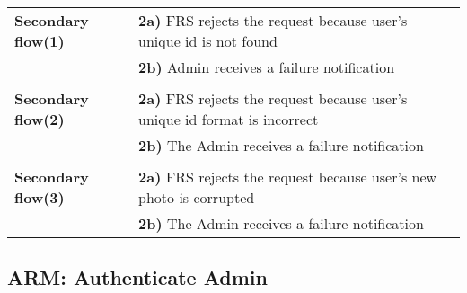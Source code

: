 \documentclass[a4paper,11pt]{article}
\begin{document}
\begin{tabular}{|p{3.5cm}|p{11.5cm}|}
    \\ \hline \rowcolor{Gray} & \\ \hline

    \textbf{Secondary flow(1)} &
    \textbf{2a)} FRS rejects the request because user's unique id is not found \\&
    \textbf{2b)} Admin receives a failure notification

    \\ \hline \rowcolor{Gray} & \\ \hline

    \textbf{Secondary flow(2)} &
    \textbf{2a)} FRS rejects the request because user's unique id format is incorrect \\&
    \textbf{2b)} The Admin receives a failure notification

    \\ \hline \rowcolor{Gray} & \\ \hline

    \textbf{Secondary flow(3)} &
    \textbf{2a)} FRS rejects the request because user's new photo is corrupted\\&
    \textbf{2b)} The Admin receives a failure notification

    \\ \hline
\end{tabular}

\subsection{ARM: Authenticate Admin}
\end{document}
